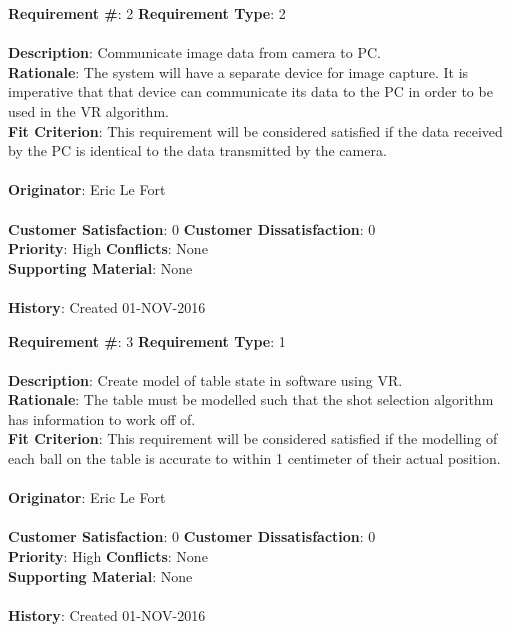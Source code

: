 \documentclass[titlepage]{article}
\begin{document}
\begin{framed}
	\noindent\textbf{Requirement \#}: 2 \hfill \textbf{Requirement Type}: 2 \hfill\\\\
	\noindent\textbf{Description}: Communicate image data from camera to PC.\\
	\textbf{Rationale}: The system will have a separate device for image capture. It is imperative that that device can communicate its data to the PC in order to be used in the VR algorithm.\\
	\textbf{Fit Criterion}: This requirement will be considered satisfied if the data received by the PC is identical to the data transmitted by the camera.\\\\
	\textbf{Originator}: Eric Le Fort\\\\
	\noindent\textbf{Customer Satisfaction}: 0 \hfill 	\textbf{Customer Dissatisfaction}: 0 \hfill\\
	\textbf{Priority}: High \hfill \textbf{Conflicts}: None \hfill\\
	\textbf{Supporting Material}: None\\\\
	\noindent\textbf{History}: Created 01-NOV-2016
\end{framed}

\begin{framed}
	\noindent\textbf{Requirement \#}: 3 \hfill \textbf{Requirement Type}: 1 \hfill\\\\
	\noindent\textbf{Description}: Create model of table state in software using VR.\\
	\textbf{Rationale}: The table must be modelled such that the shot selection algorithm has information to work off of.\\
	\textbf{Fit Criterion}: This requirement will be considered satisfied if the modelling of each ball on the table is accurate to within 1 centimeter of their actual position.\\\\
	\textbf{Originator}: Eric Le Fort\\\\
	\noindent\textbf{Customer Satisfaction}: 0 \hfill 	\textbf{Customer Dissatisfaction}: 0 \hfill\\
	\textbf{Priority}: High \hfill \textbf{Conflicts}: None \hfill\\
	\textbf{Supporting Material}: None\\\\
	\noindent\textbf{History}: Created 01-NOV-2016
\end{framed}
\end{document}
